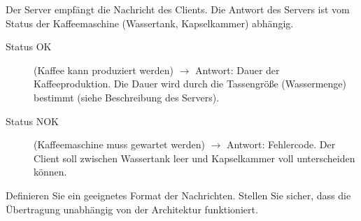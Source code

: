 Der Server empfängt die Nachricht des Clients. Die Antwort des Servers ist vom
Status der Kaffeemaschine (Wassertank, Kapselkammer) abhängig.
%
\begin{description}
\item[Status OK] (Kaffee kann produziert werden) $\rightarrow$ Antwort: Dauer
  der Kaffeeproduktion. Die Dauer wird durch die Tassengröße (Wassermenge)
  bestimmt (siehe Beschreibung des Servers).
\item[Status NOK] (Kaffeemaschine muss gewartet werden) $\rightarrow$ Antwort:
  Fehlercode. Der Client soll zwischen Wassertank leer und Kapselkammer voll
  unterscheiden können.
\end{description}

Definieren Sie ein geeignetes Format der Nachrichten. Stellen Sie sicher, dass
die Übertragung unabhängig von der Architektur funktioniert.


\osueguidelinesone



